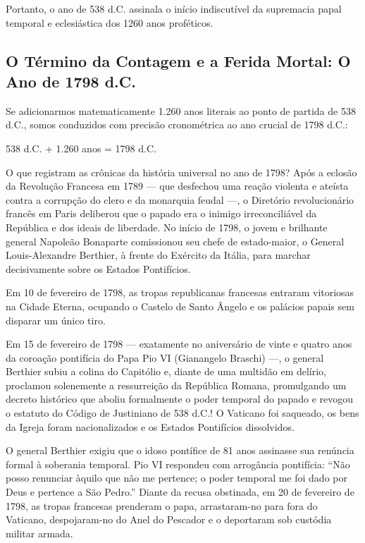 Portanto, o ano de 538 d.C. assinala o início indiscutível da supremacia papal temporal e eclesiástica dos 1260 anos proféticos.



\subsection{O Término da Contagem e a Ferida Mortal: O Ano de 1798 d.C.}


Se adicionarmos matematicamente 1.260 anos literais ao ponto de partida de 538 d.C., somos conduzidos com precisão cronométrica ao ano crucial de 1798 d.C.:

538 d.C. + 1.260 anos = 1798 d.C.

O que registram as crônicas da história universal no ano de 1798?
Após a eclosão da Revolução Francesa em 1789 — que desfechou uma reação violenta e ateísta contra a corrupção do clero e da monarquia feudal —, o Diretório revolucionário francês em Paris deliberou que o papado era o inimigo irreconciliável da República e dos ideais de liberdade. No início de 1798, o jovem e brilhante general Napoleão Bonaparte comissionou seu chefe de estado-maior, o General Louis-Alexandre Berthier, à frente do Exército da Itália, para marchar decisivamente sobre os Estados Pontifícios.

Em 10 de fevereiro de 1798, as tropas republicanas francesas entraram vitoriosas na Cidade Eterna, ocupando o Castelo de Santo Ângelo e os palácios papais sem disparar um único tiro.

Em 15 de fevereiro de 1798 — exatamente no aniversário de vinte e quatro anos da coroação pontifícia do Papa Pio VI (Gianangelo Braschi) —, o general Berthier subiu a colina do Capitólio e, diante de uma multidão em delírio, proclamou solenemente a ressurreição da República Romana, promulgando um decreto histórico que aboliu formalmente o poder temporal do papado e revogou o estatuto do Código de Justiniano de 538 d.C.! O Vaticano foi saqueado, os bens da Igreja foram nacionalizados e os Estados Pontifícios dissolvidos.

O general Berthier exigiu que o idoso pontífice de 81 anos assinasse sua renúncia formal à soberania temporal. Pio VI respondeu com arrogância pontifícia: ``Não posso renunciar àquilo que não me pertence; o poder temporal me foi dado por Deus e pertence a São Pedro.'' Diante da recusa obstinada, em 20 de fevereiro de 1798, as tropas francesas prenderam o papa, arrastaram-no para fora do Vaticano, despojaram-no do Anel do Pescador e o deportaram sob custódia militar armada.

